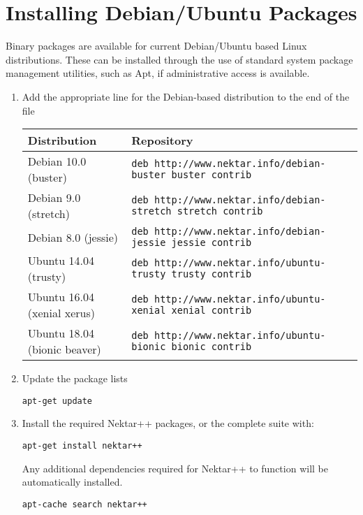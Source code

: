 \section{Installing Debian/Ubuntu Packages}
\label{s:installation:debian}
Binary packages are available for current Debian/Ubuntu based Linux
distributions. These can be installed through the use of standard system package
management utilities, such as Apt, if administrative access is
available.

\begin{enumerate}
	\item Add the appropriate line for the Debian-based distribution to the end of
	the file 
	
	{\small
	\begin{tabular}{ll}
	\toprule
	Distribution & Repository \\
	\midrule
    Debian 10.0 (buster) &
        \texttt{deb http://www.nektar.info/debian-buster buster contrib} \\
    Debian 9.0 (stretch) &
        \texttt{deb http://www.nektar.info/debian-stretch stretch contrib} \\
    Debian 8.0 (jessie) &
       \texttt{deb http://www.nektar.info/debian-jessie jessie contrib} \\
	Ubuntu 14.04 (trusty) & 
	   \texttt{deb http://www.nektar.info/ubuntu-trusty trusty contrib}\\
	Ubuntu 16.04 (xenial xerus) & 
        \texttt{deb http://www.nektar.info/ubuntu-xenial xenial contrib}\\
	Ubuntu 18.04 (bionic beaver) & 
        \texttt{deb http://www.nektar.info/ubuntu-bionic bionic contrib}\\
	\bottomrule
	\end{tabular}
	}
	\item Update the package lists
	\begin{lstlisting}[style=BashInputStyle]
	apt-get update
	\end{lstlisting}
	\item Install the required Nektar++ packages, or the complete suite with:
	\begin{lstlisting}[style=BashInputStyle]
	apt-get install nektar++
	\end{lstlisting}
	Any additional dependencies required for Nektar++ to function will be
	automatically installed.
	
    \newsavebox\installationDebTip
    \begin{lrbox}{\installationDebTip}\begin{minipage}{0.8\linewidth}
    \begin{lstlisting}[style=BashInputStyle]
    apt-cache search nektar++
    \end{lstlisting}
    \end{minipage}
    \end{lrbox}
	

\end{enumerate}
